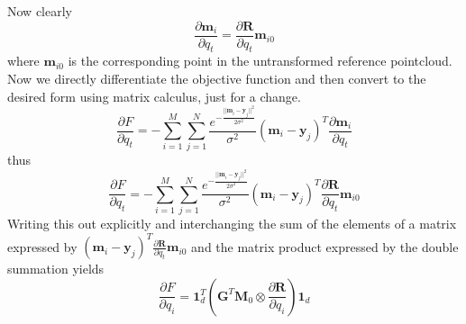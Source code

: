 \documentclass[11pt, a4paper]{article}
\begin{document}
Now clearly $$\frac{\partial \textbf{m}_i}{\partial q_t} = \frac{\partial \textbf{R}}{\partial q_t} \textbf{m}_{i0}$$ where $\textbf{m}_{i0}$ is the corresponding point in the untransformed reference pointcloud. Now we directly differentiate the objective function and then convert to the desired form using matrix calculus, just for a change. 
$$\frac{\partial F}{\partial q_t} = -\sum_{i=1}^M \sum_{j=1}^N \frac{e^{-\frac{|| \textbf{m}_i - \textbf{y}_j ||^2}{2 \sigma^2}}}{\sigma^2} (\textbf{m}_i - \textbf{y}_j)^T \frac{\partial \textbf{m}_i}{\partial q_t}$$
thus
$$\frac{\partial F}{\partial q_t} = -\sum_{i=1}^M \sum_{j=1}^N \frac{e^{-\frac{|| \textbf{m}_i - \textbf{y}_j ||^2}{2 \sigma^2}}}{\sigma^2} (\textbf{m}_i - \textbf{y}_j)^T \frac{\partial \textbf{R}}{\partial q_t} \textbf{m}_{i0}$$
Writing this out explicitly and interchanging the sum of the elements of a matrix expressed by $(\textbf{m}_i - \textbf{y}_j)^T \frac{\partial \textbf{R}}{\partial q_t} \textbf{m}_{i0}$ and the matrix product expressed by the double summation yields  $$\frac{\partial F}{\partial q_i} = \textbf{1}_d^T \left(\textbf{G}^T\textbf{M}_0 \otimes \frac{\partial \textbf{R}}{\partial q_i}\right)\textbf{1}_d$$
\end{document}
